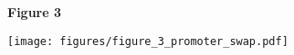 \documentclass[8pt]{extarticle}
\begin{document}

\newpage

\textbf{\large Figure 3}

\texttt{[image: figures/figure\_3\_promoter\_swap.pdf]}

\end{document}
